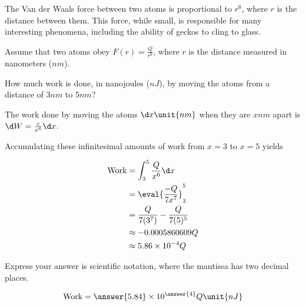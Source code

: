 \documentclass{ximera}
\author{Steven Gubkin}
\begin{document}
\begin{exercise}


The Van der Waals force between two atoms is proportional to $r^6$, where $r$ is the distance between them.  This force, while small, is responsible for many interesting phenomena, including the ability of geckos to cling to glass.

Assume that two atoms obey $F(r) = \frac{Q}{r^6}$, where $r$ is the distance measured in nanometers ($\unit{nm}$).

How much work is done, in nanojoules ($\unit{nJ}$), by moving the atoms from a distance of  $3 \unit{nm}$ to $5 \unit{nm}$?

\begin{hint}
The work done by moving the atoms $\d x \unit{nm}$ when they are $x \unit{nm}$ apart is $\d W = \frac{c}{x^6} \d x$.
\end{hint}

\begin{hint}
Accumulating these infinitesimal amounts of work from $x = 3$ to $x = 5$ yields

\begin{align*}
\textrm{Work} &=  \int_3^5 \frac{Q}{x^6} \d x\\
	&= \eval{\frac{-Q}{7x^7}}_3^5\\
	&=\frac{Q}{7(3^7)} - \frac{Q}{7(5)^5}\\
	&\approx -0.0005860609 Q\\
	&\approx 5.86 \times 10^{-4} Q
\end{align*}
\end{hint}

\begin{prompt}
	Express your answer is scientific notation, where the mantissa has two decimal places.
	
	\[
	\textrm{Work} = \answer{5.84} \times 10^{\answer{4}} Q \unit{nJ}
	\]
\end{prompt}

\end{exercise}
\end{document}
